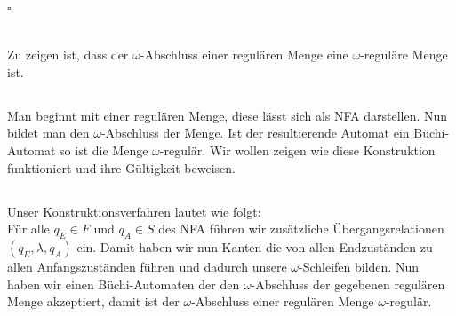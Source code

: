 \documentclass[12pt,a4paper]{../krautsourcing/homework}
\begin{document}
\hfill \(\square\)

\section{}
Zu zeigen ist, dass der \(\omega\)-Abschluss einer regulären Menge eine \(\omega\)-reguläre Menge ist.

\subsection{}
Man beginnt mit einer regulären Menge, diese lässt sich als NFA darstellen. Nun bildet man den \(\omega\)-Abschluss der Menge. Ist der resultierende Automat ein Büchi-Automat so ist die Menge \(\omega\)-regulär. Wir wollen zeigen wie diese Konstruktion funktioniert und ihre Gültigkeit beweisen.
\subsection{}
Unser Konstruktionsverfahren lautet wie folgt:\\
Für alle \(q_E \in F\) und \(q_A \in S\) des NFA führen wir zusätzliche Übergangsrelationen \((q_E, \lambda, q_A)\) ein.
Damit haben wir nun Kanten die von allen Endzuständen zu allen Anfangszuständen führen und dadurch unsere \glqq \(\omega\)-Schleifen\grqq{} bilden. Nun haben wir einen Büchi-Automaten der den \(\omega\)-Abschluss der gegebenen regulären Menge akzeptiert, damit ist der \(\omega\)-Abschluss einer regulären Menge \(\omega\)-regulär.
\newpage
\end{document}

